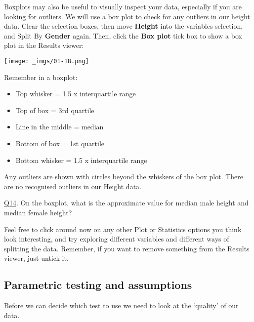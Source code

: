 \documentclass[
  letterpaper,
  DIV=11,
  numbers=noendperiod]{scrartcl}
\providecommand{\tightlist}{%
  \setlength{\itemsep}{0pt}\setlength{\parskip}{0pt}}\usepackage{longtable,booktabs,array}
\begin{document}
Boxplots may also be useful to visually inspect your data, especially if
you are looking for outliers. We will use a box plot to check for any
outliers in our height data. Clear the selection boxes, then move
\textbf{Height} into the variables selection, and Split By
\textbf{Gender} again. Then, click the \textbf{Box plot} tick box to
show a box plot in the Results viewer:

\texttt{[image: \_imgs/01-18.png]}

Remember in a boxplot:

\begin{itemize}
\tightlist
\item
  Top whisker = 1.5 x interquartile range
\item
  Top of box = 3rd quartile
\item
  Line in the middle = median
\item
  Bottom of box = 1st quartile
\item
  Bottom whisker = 1.5 x interquartile range
\end{itemize}

Any outliers are shown with circles beyond the whiskers of the box plot.
There are no recognised outliers in our Height data.

\begin{tcolorbox}[beforeafter skip=1cm, ignore nobreak=true, breakable, colframe=Questions-frame, colback=Questions-bg, coltext=Questions-text, boxsep=2mm, arc=0mm, boxrule=0.5mm]

\protect\hypertarget{Q14}{\protect\hyperlink{A14}{Q14}}. On the boxplot,
what is the approximate value for median male height and median female
height?

\end{tcolorbox}

Feel free to click around now on any other Plot or Statistics options
you think look interesting, and try exploring different variables and
different ways of splitting the data. Remember, if you want to remove
something from the Results viewer, just untick it.

\hypertarget{parametric-testing-and-assumptions}{%
\subsection{Parametric testing and
assumptions}\label{parametric-testing-and-assumptions}}

Before we can decide which test to use we need to look at the `quality'
of our data.
\end{document}
